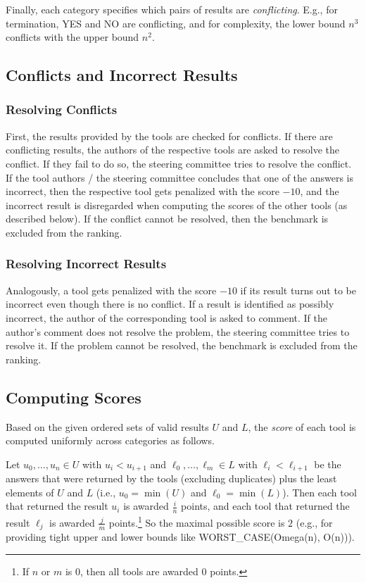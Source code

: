 Finally, each category specifies which pairs of results are \emph{conflicting}.
%
E.g., for termination, YES and NO are conflicting, and for complexity, the lower bound $n^3$ conflicts with the upper bound $n^2$.

\subsection{Conflicts and Incorrect Results}

\subsubsection{Resolving Conflicts}

First, the results provided by the tools are checked for conflicts.
%
If there are conflicting results, the authors of the respective tools are asked to resolve the conflict.
%
If they fail to do so, the steering committee tries to resolve the conflict.
%
If the tool authors / the steering committee concludes that one of the answers is incorrect, then the respective tool gets penalized with the score $-10$, and the incorrect result is disregarded when computing the scores of the other tools (as described below).
%
If the conflict cannot be resolved, then the benchmark is excluded from the ranking.

\subsubsection{Resolving Incorrect Results}

Analogously, a tool gets penalized with the score $-10$ if its result turns out to be incorrect even though there is no conflict.
%
If a result is identified as possibly incorrect, the author of the corresponding tool is asked to comment.
%
If the author's comment does not resolve the problem, the steering committee tries to resolve it.
%
If the problem cannot be resolved, the benchmark is excluded from the ranking.

\subsection{Computing Scores}

Based on the given ordered sets of valid results $U$ and $L$, the \emph{score} of each tool is computed uniformly across categories as follows.

Let $u_0,\ldots,u_n \in U$ with $u_i < u_{i+1}$ and $\ell_0,\ldots,\ell_m \in L$ with $\ell_i < \ell_{i+1}$ be the answers that were returned by the tools (excluding duplicates) plus the least elements of $U$ and $L$ (i.e., $u_0 = \min(U)$ and $\ell_0 = \min(L)$).
%
Then each tool that returned the result $u_i$ is awarded $\frac{i}{n}$ points, and each tool that returned the result $\ell_j$ is awarded $\frac{j}{m}$ points.\footnote{If $n$ or $m$ is $0$, then all tools are awarded $0$ points.}
%
So the maximal possible score is $2$ (e.g., for providing tight upper and lower bounds like WORST\_CASE(Omega(n), O(n))).

